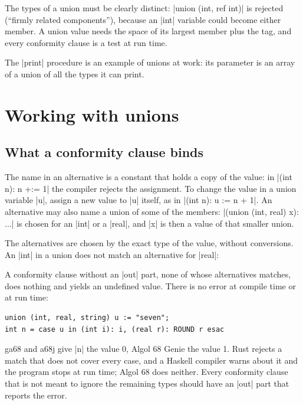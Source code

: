 The types of a union must be clearly distinct: \code|union (int, ref int)|
is rejected (``firmly related components''), because an \code|int|
variable could become either member. A union value needs the space of
its largest member plus the tag, and every conformity clause is a test at
run time.

The \code|print| procedure is an example of unions at work: its parameter
is an array of a union of all the types it can print.

\section{Working with unions}\label{sec-union-details}

\subsection*{What a conformity clause binds}

The name in an alternative is a constant that holds a copy of the value:
in \code|(int n): n +:= 1| the compiler rejects the assignment. To
change the value in a union variable \code|u|, assign a new value to
\code|u| itself, as in \code|(int n): u := n + 1|. An alternative may also
name a union of some of the members: \code|(union (int, real) x): ...|
is chosen for an \code|int| or a \code|real|, and \code|x| is then a
value of that smaller union.

The alternatives are chosen by the exact type of the value, without
conversions. An \code|int| in a union does not match an alternative for
\code|real|:


\begin{pitfall}
A conformity clause without an \code|out| part, none of whose
alternatives matches, does nothing and yields an undefined value. There
is no error at compile time or at run time:
\begin{lstlisting}
union (int, real, string) u := "seven";
int n = case u in (int i): i, (real r): ROUND r esac
\end{lstlisting}
ga68 and a68j give \code|n| the value 0, Algol 68 Genie the value 1.
Rust rejects a match that does not cover every case, and a Haskell
compiler warns about it and the program stops at run time; Algol 68 does
neither. Every conformity clause that is not meant to ignore
the remaining types should have an \code|out| part that reports the
error.
\end{pitfall}

